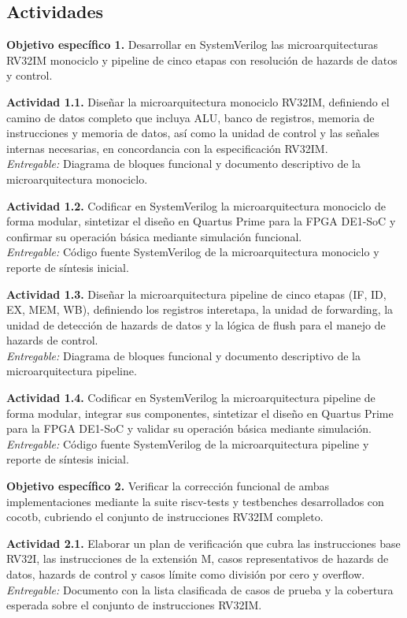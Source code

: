 \subsection{Actividades}

\textbf{Objetivo específico 1.} Desarrollar en SystemVerilog las microarquitecturas RV32IM monociclo y pipeline de cinco etapas con resolución de hazards de datos y control.

\textbf{Actividad 1.1.}
Diseñar la microarquitectura monociclo RV32IM, definiendo el camino de datos completo que incluya ALU, banco de registros, memoria de instrucciones y memoria de datos, así como la unidad de control y las señales internas necesarias, en concordancia con la especificación RV32IM.
\\
\textit{Entregable:} Diagrama de bloques funcional y documento descriptivo de la microarquitectura monociclo.

\textbf{Actividad 1.2.}
Codificar en SystemVerilog la microarquitectura monociclo de forma modular, sintetizar el diseño en Quartus Prime para la FPGA DE1-SoC y confirmar su operación básica mediante simulación funcional.
\\
\textit{Entregable:} Código fuente SystemVerilog de la microarquitectura monociclo y reporte de síntesis inicial.

\textbf{Actividad 1.3.}
Diseñar la microarquitectura pipeline de cinco etapas (IF, ID, EX, MEM, WB), definiendo los registros interetapa, la unidad de forwarding, la unidad de detección de hazards de datos y la lógica de flush para el manejo de hazards de control.
\\
\textit{Entregable:} Diagrama de bloques funcional y documento descriptivo de la microarquitectura pipeline.

\textbf{Actividad 1.4.}
Codificar en SystemVerilog la microarquitectura pipeline de forma modular, integrar sus componentes, sintetizar el diseño en Quartus Prime para la FPGA DE1-SoC y validar su operación básica mediante simulación.
\\
\textit{Entregable:} Código fuente SystemVerilog de la microarquitectura pipeline y reporte de síntesis inicial.

\textbf{Objetivo específico 2.} Verificar la corrección funcional de ambas implementaciones mediante la suite riscv-tests y testbenches desarrollados con cocotb, cubriendo el conjunto de instrucciones RV32IM completo.

\textbf{Actividad 2.1.}
Elaborar un plan de verificación que cubra las instrucciones base RV32I, las instrucciones de la extensión M, casos representativos de hazards de datos, hazards de control y casos límite como división por cero y overflow.
\\
\textit{Entregable:} Documento con la lista clasificada de casos de prueba y la cobertura esperada sobre el conjunto de instrucciones RV32IM.

